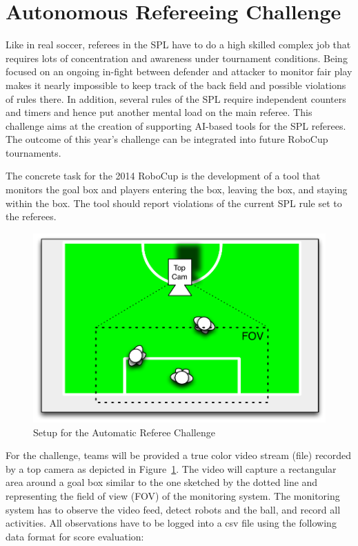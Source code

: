\documentclass[12pt]{article}
\begin{document}
\newpage






\section{Autonomous Refereeing Challenge}

Like in real soccer, referees in the SPL have to do a high skilled complex job that requires lots of concentration and awareness under tournament conditions. Being focused on an ongoing in-fight between defender and attacker to monitor fair play makes it nearly impossible to keep track of the back field and possible violations of rules there. In addition, several rules of the SPL require independent counters and timers and hence put another mental load on the main referee. This challenge aims at the creation of supporting AI-based tools for the SPL referees. The outcome of this year's challenge can be integrated into future RoboCup tournaments.

The concrete task for the 2014 RoboCup is the development of a tool that monitors the goal box and players entering the box, leaving the box, and staying within the box. The tool should report violations of the current SPL rule set to the referees.

\begin{figure}[th!]
\centerline{\includegraphics[width=0.65\columnwidth]{figures/refmon}}
\caption{Setup for the Automatic Referee Challenge}
\label{fig:referee_challenge}
\end{figure}

For the challenge, teams will be provided a true color video stream (file) recorded by a top camera as depicted in Figure~\ref{fig:referee_challenge}. The video will capture a rectangular area around a goal box similar to the one sketched by the dotted line and representing the field of view (FOV) of the monitoring system. The monitoring system has to observe the video feed, detect robots and the ball, and record all activities. All observations have to be logged into a csv file using the following data format for score evaluation:
\end{document}
